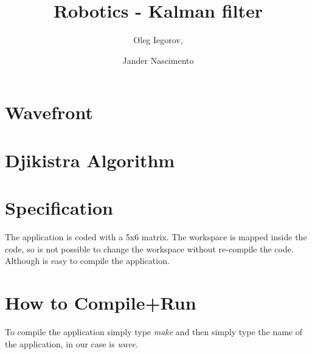 \documentclass{article}
\begin{document}
\title{Robotics - Kalman filter}

\author{Oleg Iegorov, 
\and Jander Nascimento}

\maketitle

\section{Wavefront}


\section{Djikistra Algorithm}


\section{Specification}

The application is coded with a 5x6 matrix. The workspace is mapped inside the code, so is not possible to change the workspace without re-compile the code. Although is easy to compile the application.

\section{How to Compile+Run}

To compile the application simply type {\it make} and then simply type the name of the application, in our case is \emph{wave}.
\end{document}
